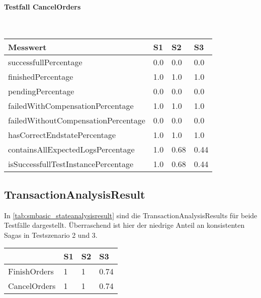 \paragraph*{Testfall CancelOrders} \mbox{}\\

\begin{center}
	\fontsize{9}{12}\selectfont
	\begin{longtable}[h]{|p{5cm}|p{1cm}|p{1cm}|p{1cm}|}
		\hline
		Messwert & S1 & S2 & S3 \\ \hline
		\endhead
		\endfoot
		successfull\-Percentage & 0.0 & 0.0 & 0.0 \\ \hline
		finished\-Percentage & 1.0 & 1.0 & 1.0 \\ \hline
		pending\-Percentage & 0.0 & 0.0 & 0.0 \\ \hline
		failedWithCompensation\-Percentage & 1.0 & 1.0 & 1.0 \\ \hline
		failedWithoutCompensation\-Percentage & 0.0 & 0.0 & 0.0 \\ \hline
		hasCorrectEndstate\-Percentage & 1.0 & 1.0 & 1.0 \\ \hline
		containsAllExpectedLogs\-Percentage & 1.0 & 0.68 & 0.44 \\ \hline
		isSuccessfullTestInstance\-Percentage & 1.0 & 0.68 & 0.44 \\ \hline
	\end{longtable}
\end{center}
\FloatBarrier

\subsection{TransactionAnalysisResult}
In \cref{tab:smbasic_stateanalysisresult} sind die TransactionAnalysisResults für beide Testfälle dargestellt. Überraschend ist hier der niedrige Anteil an konsistenten Sagas in Testszenario 2 und 3. 

\begin{center}
	\fontsize{9}{12}\selectfont
	\begin{longtable}[h]{|p{5cm}|p{1cm}|p{1cm}|p{1cm}|}
		\hline
		& S1 & S2 & S3 \\ \hline
		\endhead
		\endfoot
		FinishOrders & 1 & 1 & 0.74\\ \hline	
		CancelOrders & 1 & 1 & 0.74\\ \hline
	\end{longtable}
\end{center}
\FloatBarrier

